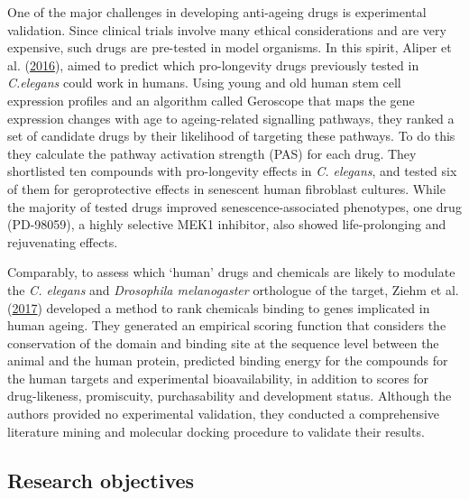 \documentclass[12pt,twoside]{unicam}
\begin{document}
One of the major challenges in developing anti-ageing drugs is experimental validation. Since clinical trials involve many ethical considerations and are very expensive, such drugs are pre-tested in model organisms. In this spirit, Aliper et al. (\protect\hyperlink{ref-Aliper2016}{2016}), aimed to predict which pro-longevity drugs previously tested in \emph{C.elegans} could work in humans. Using young and old human stem cell expression profiles and an algorithm called Geroscope that maps the gene expression changes with age to ageing-related signalling pathways, they ranked a set of candidate drugs by their likelihood of targeting these pathways. To do this they calculate the pathway activation strength (PAS) for each drug. They shortlisted ten compounds with pro-longevity effects in \emph{C. elegans}, and tested six of them for geroprotective effects in senescent human fibroblast cultures. While the majority of tested drugs improved senescence-associated phenotypes, one drug (PD-98059), a highly selective MEK1 inhibitor, also showed life-prolonging and rejuvenating effects.

Comparably, to assess which `human' drugs and chemicals are likely to modulate the \emph{C. elegans} and \emph{Drosophila melanogaster} orthologue of the target, Ziehm et al. (\protect\hyperlink{ref-Ziehm2017}{2017}) developed a method to rank chemicals binding to genes implicated in human ageing. They generated an empirical scoring function that considers the conservation of the domain and binding site at the sequence level between the animal and the human protein, predicted binding energy for the compounds for the human targets and experimental bioavailability, in addition to scores for drug-likeness, promiscuity, purchasability and development status. Although the authors provided no experimental validation, they conducted a comprehensive literature mining and molecular docking procedure to validate their results.

\hypertarget{research-objectives-2}{%
\subsection{Research objectives}\label{research-objectives-2}}
\end{document}

